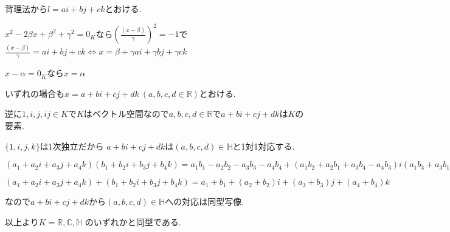 \documentclass{jsarticle}
\begin{document}
背理法から$l=ai+bj+ck$とおける.

$x^2-2\beta x+\beta^2+\gamma^2=0_K$なら$(\frac{(x-\beta)}{\gamma})^2=-1$で$\frac{(x-\beta)}{\gamma}=ai+bj+ck\Leftrightarrow x = \beta+\gamma ai+\gamma bj+\gamma ck$

$x-\alpha=0_K$なら$x=\alpha$

いずれの場合も$x=a+bi+cj+dk \ (a,b,c,d\in\mathbb{R})$とおける.

逆に$1,i,j,ij\in K$で$K$はベクトル空間なので$a,b,c,d\in\mathbb{R}$で$a+bi+cj+dk$は$K$の要素.

$\{1,i,j,k\}$は1次独立だから
$a+bi+cj+dk$は$(a,b,c,d) \in\mathbb{H}$と1対1対応する.

$(a_1+a_2i+a_3j+a_4k)(b_1+b_2i+b_3j+b_4k)
=a_1b_1-a_2b_2-a_3b_3-a_4b_4+(a_1b_2+a_2b_1+a_3b_4-a_4b_3)i
(a_1b_3+a_3b_1+a_4b_2-a_2b_4)j
(a_1b_4+a_4b_1+a_2b_3-a_3b_2)k$

$(a_1+a_2i+a_3j+a_4k)+(b_1+b_2i+b_3j+b_4k)=a_1+b_1+(a_2+b_2)i+(a_3+b_3)j+(a_4+b_4)k$

なので$a+bi+cj+dk$から$(a,b,c,d)\in\mathbb{H}$への対応は同型写像.

以上より$K=\mathbb{R},\mathbb{C},\mathbb{H}$
のいずれかと同型である.
\end{document}
